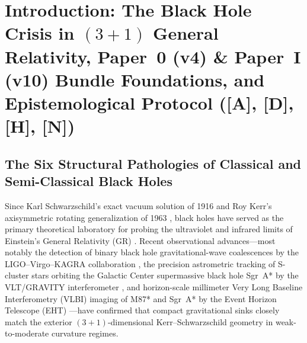 \documentclass[11pt,a4paper]{article}
\newcommand{\catA}{\textbf{\textcolor{purple!80!black}{[A]}}}
\newcommand{\catD}{\textbf{\textcolor{blue!75!black}{[D]}}}
\newcommand{\catH}{\textbf{\textcolor{orange!85!black}{[H]}}}
\newcommand{\catN}{\textbf{\textcolor{teal!75!black}{[N]}}}
\theoremstyle{plain}
\theoremstyle{definition}
\theoremstyle{remark}
\numberwithin{equation}{section}
\begin{document}
\section{\texorpdfstring{Introduction: The Black Hole Crisis in $(3+1)$ General Relativity, Paper~0 (v4) \& Paper~I (v10) Bundle Foundations, and Epistemological Protocol (\catA, \catD, \catH, \catN)}{Introduction: The Black Hole Crisis in (3+1) General Relativity, Paper 0 (v4) and Paper I (v10) Bundle Foundations, and Epistemological Protocol}}

\subsection{The Six Structural Pathologies of Classical and Semi-Classical Black Holes}

Since Karl Schwarzschild's exact vacuum solution of 1916 \cite{schwarzschild1916} and Roy Kerr's axisymmetric rotating generalization of 1963 \cite{kerr1963}, black holes have served as the primary theoretical laboratory for probing the ultraviolet and infrared limits of Einstein's General Relativity (GR) \cite{einstein1915,adm1962,chandrasekhar1983}. Recent observational advances---most notably the detection of binary black hole gravitational-wave coalescences by the LIGO--Virgo--KAGRA collaboration \cite{ligo2016,abbott2021}, the precision astrometric tracking of S-cluster stars orbiting the Galactic Center supermassive black hole Sgr~A* by the VLT/GRAVITY interferometer \cite{gravity2018,gravity2020}, and horizon-scale millimeter Very Long Baseline Interferometry (VLBI) imaging of M87* and Sgr~A* by the Event Horizon Telescope (EHT) \cite{eht2019,eht2022}---have confirmed that compact gravitational sinks closely match the exterior $(3+1)$-dimensional Kerr--Schwarzschild geometry in weak-to-moderate curvature regimes.
\end{document}
